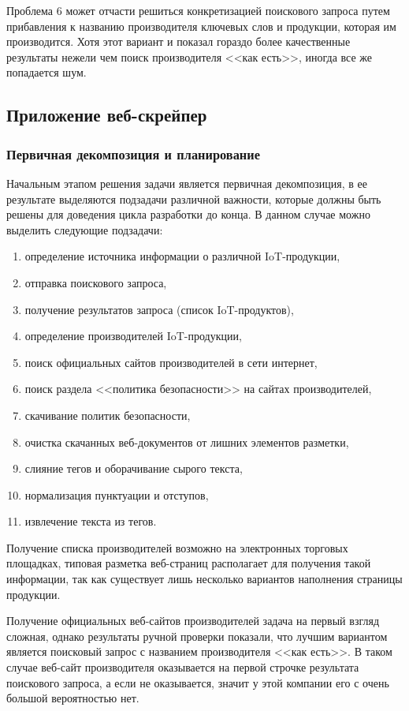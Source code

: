 \documentclass[../main]{subfiles}
\begin{document}
Проблема 6 может отчасти решиться конкретизацией поискового запроса путем прибавления к названию производителя ключевых слов и продукции, которая им производится. Хотя этот вариант и показал гораздо более качественные результаты нежели чем поиск производителя <<как есть>>, иногда все же попадается шум.

\subsection{Приложение веб-скрейпер}

\subsubsection{Первичная декомпозиция и планирование}

Начальным этапом решения задачи является первичная декомпозиция, в ее результате выделяются подзадачи различной важности, которые должны быть решены для доведения цикла разработки до конца. В данном случае можно выделить следующие подзадачи:
\begin{enumerate}
    \item определение источника информации о различной IoT-продукции,
    \item отправка поискового запроса,
    \item получение результатов запроса (список IoT-продуктов),
    \item определение производителей IoT-продукции,
    \item поиск официальных сайтов производителей в сети интернет,
    \item поиск раздела <<политика безопасности>> на сайтах производителей,
    \item скачивание политик безопасности,
    \item очистка скачанных веб-документов от лишних элементов разметки,
    \item слияние тегов и оборачивание сырого текста,
    \item нормализация пунктуации и отступов,
    \item извлечение текста из тегов.
\end{enumerate}

Получение списка производителей возможно на электронных торговых площадках, типовая разметка веб-страниц располагает для получения такой информации, так как существует лишь несколько вариантов наполнения страницы продукции.

Получение официальных веб-сайтов производителей задача на первый взгляд сложная, однако результаты ручной проверки показали, что лучшим вариантом является поисковый запрос с названием производителя <<как есть>>. В таком случае веб-сайт производителя оказывается на первой строчке результата поискового запроса, а если не оказывается, значит у этой компании его с очень большой вероятностью нет.
\end{document}
